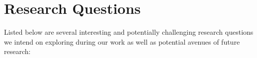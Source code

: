 \documentclass[12pt, a4paper]{article}
\theoremstyle{definition}
\begin{document}

\section{Research Questions}
Listed below are several interesting and potentially challenging research questions we intend on exploring during our work as well as potential avenues of future research:
\end{document}
